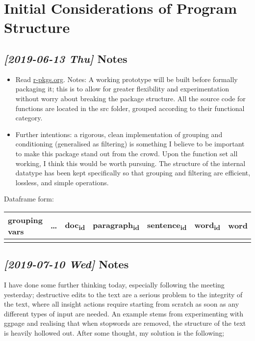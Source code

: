 \documentclass[a4paper, 11pt]{article}
\begin{document}
\section{Initial Considerations of Program Structure}
\label{sec:org6e91536}
\subsection{\textit{[2019-06-13 Thu] } Notes}
\label{sec:orgd9c2cea}
\begin{itemize}
\item Read \href{http://r-pkgs.org}{r-pkgs.org}. Notes: A working prototype will be built before
formally packaging it; this is to allow for greater flexibility and
experimentation without worry about breaking the package structure.
All the source code for functions are located in the src folder,
grouped according to their functional category.
\item Further intentions: a rigorous, clean implementation of grouping and
conditioning (generalised as filtering) is something I believe to be
important to make this package stand out from the crowd. Upon the
function set all working, I think this would be worth pursuing. The
structure of the internal datatype has been kept specifically so
that grouping and filtering are efficient, lossless, and simple
operations.
\end{itemize}
Dataframe form:

\begin{center}
\begin{tabular}{lllllll}
grouping vars & \ldots{} & doc\textsubscript{id} & paragraph\textsubscript{id} & sentence\textsubscript{id} & word\textsubscript{id} & word\\
\hline
 &  &  &  &  &  & \\
\end{tabular}
\end{center}
\subsection{\textit{[2019-07-10 Wed] } Notes}
\label{sec:orgd0a195c}
I have done some further thinking today, especially
following the meeting yesterday; destructive edits to the text are a
serious problem to the integrity of the text, where all insight
actions require starting from scratch as soon as any different types
of input are needed. An example stems from experimenting with ggpage and
realising that when stopwords are removed, the structure of the text
is heavily hollowed out. After some thought, my solution is the following;
\end{document}

